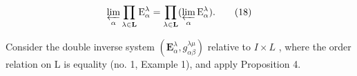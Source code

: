\[
\varprojlim_ {\alpha} \prod_ {\lambda \in \mathbf {L}} \mathrm{E} _ {\alpha} ^ {\lambda} = \prod_ {\lambda \in \mathbf {L}} (\varprojlim_ {\alpha} \mathrm{E} _ {\alpha} ^ {\lambda}).\tag{18}
\]

Consider the double inverse system \((\mathbf{E}_{\alpha}^{\lambda}, g_{\alpha\beta}^{\lambda\mu})\) relative to \(I \times L\) , where the order relation on L is equality (no. 1, Example 1), and apply Proposition 4.

